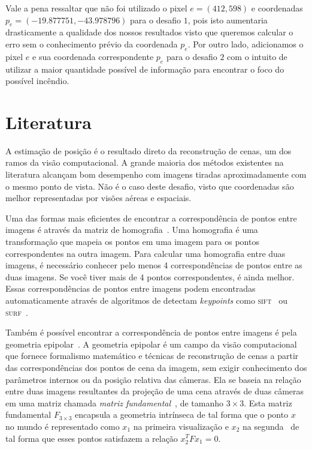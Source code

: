 \documentclass[12pt]{report}
\begin{document}
{{
	\color{red}
	\noindent Vale a pena ressaltar que não foi utilizado o pixel $e = (412, 598)$ e coordenadas $p_{e} = (-19.877751, -43.978796)$ para o desafio $1$, pois isto aumentaria drasticamente a qualidade dos nossos resultados visto que queremos calcular o erro sem o conhecimento prévio da coordenada $p_{e}$.
	Por outro lado, adicionamos o pixel $e$ e sua coordenada correspondente $p_{e}$ para o desafio $2$ com o intuito de utilizar a maior quantidade possível de informação para encontrar o foco do possível incêndio.
}


\section*{Literatura}
A estimação de posição é o resultado direto da reconstrução de cenas, um dos ramos da visão computacional.
A grande maioria dos métodos existentes na literatura alcançam bom desempenho com imagens tiradas aproximadamente com o mesmo ponto de vista.
Não é o caso deste desafio, visto que coordenadas são melhor representadas por visões aéreas e espaciais.

Uma das formas mais eficientes de encontrar a correspondência de pontos entre imagens é através da matriz de homografia~\cite{dubrofsky2009homography}.
Uma homografia é uma transformação que mapeia os pontos em uma imagem para os pontos correspondentes na outra imagem.
Para calcular uma homografia entre duas imagens, é necessário conhecer pelo menos 4 correspondências de pontos entre as duas imagens. 
Se você tiver mais de 4 pontos correspondentes, é ainda melhor.
Essas correspondências de pontos entre imagens podem encontradas automaticamente através de algoritmos de detectam \textit{keypoints} como \textsc{sift}~\cite{lowe2004distinctive} ou \textsc{surf}~\cite{bay2006surf}.


Também é possível encontrar a correspondência de pontos entre imagens é pela geometria epipolar~\cite{zhang1998determining}.
A geometria epipolar é um campo da visão computacional que fornece formalismo matemático e técnicas de reconstrução de cenas a partir das correspondências dos pontos de cena da imagem, sem exigir conhecimento dos parâmetros internos ou da posição relativa das câmeras.
Ela se baseia na relação entre duas imagens resultantes da projeção de uma cena através de duas câmeras em uma matriz chamada \textit{matriz fundamental}~\cite{luong1993determining}, de tamanho $3 \times 3$.
Esta matriz fundamental $F_{3 \times 3}$ encapsula a geometria intrínseca de tal forma que o ponto $x$ no mundo é representado como $x_{1}$ na primeira visualização e $x_{2}$ na segunda~\cite{hartley2004multiple} de tal forma que esses pontos satisfazem a relação $x^{T}_{2} F x_{1} = 0$.

}
\end{document}
